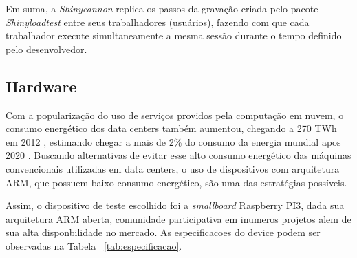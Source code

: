 \documentclass[12pt,english,brazil]{article}
\begin{document}
Em suma, a \textit{Shinycannon} replica os passos da gravação criada pelo pacote \textit{Shinyloadtest} entre seus trabalhadores (usuários), fazendo com que cada trabalhador execute simultaneamente a mesma sessão durante o tempo definido pelo desenvolvedor.

\subsection{Hardware}\label{sec:Hardware}
Com a popularização do uso de serviços providos pela computação em nuvem, o consumo energético dos data centers também aumentou, chegando a 270 TWh em 2012 \cite{VanHeddeghem:2014:TWI:2657027.2657141}, estimando chegar a mais de 2\% do consumo da energia mundial apos 2020 \cite{energy}.  Buscando alternativas de evitar esse alto consumo energético das máquinas convencionais utilizadas em data centers, o uso de dispositivos com arquitetura ARM, que possuem baixo consumo energético, são uma das estratégias possíveis.

Assim, o dispositivo de teste escolhido foi a \emph{smallboard} Raspberry PI3, dada sua arquitetura ARM aberta, comunidade participativa em inumeros projetos alem de sua alta disponbilidade no mercado. As especificacoes do device podem ser observadas na Tabela ~\ref{tab:especificacao}.
\end{document}
